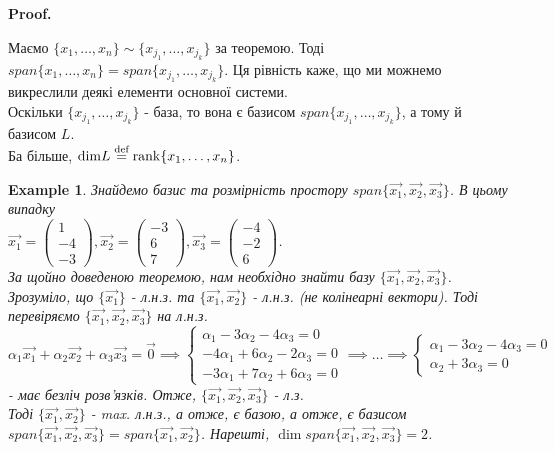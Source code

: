 \documentclass[a4paper, 10pt]{article}
\makeatletter
\def\qed{$\blacksquare$}
\theoremstyle{theoremdd}
\theoremstyle{theoremdd}
\theoremstyle{theoremdd}
\theoremstyle{theoremdd}
\newtheorem{example}[theorem]{Example}
\theoremstyle{theoremdd}
\theoremstyle{theoremdd}
\theoremstyle{theoremdd}
\theoremstyle{theoremdd}
\renewenvironment{proof}[1][Proof.\\]{\par
\pushQED{\hfill \qed}%
\normalfont \topsep6\p@\@plus6\p@\relax
\trivlist
\item\relax
{\bfseries
#1\@addpunct{.}}\hspace\labelsep\ignorespaces
}{%
\popQED\endtrivlist\@endpefalse
}
\makeatother
\begin{document}
	\begin{proof}
	Маємо $\{x_1,\dots,x_n\} \sim \{x_{j_1},\dots,x_{j_k}\}$ за теоремою. Тоді $span \{x_1,\dots,x_n\} = span \{ x_{j_1},\dots,x_{j_k} \}$. Ця рівність каже, що ми можнемо викреслили деякі елементи основної системи.\\
	Оскільки $\{x_{j_1},\dots,x_{j_k}\}$ - база, то вона є базисом $span \{ x_{j_1},\dots,x_{j_k} \}$, а тому й базисом $L$.\\
	Ба більше, $\textrm{dim} {L} \overset{\text{def}}{=} \rank \{x_1,\dots,x_n\}$.
	\end{proof}
	
	\begin{example}
	Знайдемо базис та розмірність простору $span \{ \vec{x_1}, \vec{x_2}, \vec{x_3} \}$. В цьому випадку\\
	$\vec{x_1} = \begin{pmatrix}
	1 \\ -4 \\ -3
	\end{pmatrix}, \vec{x_2} = \begin{pmatrix}
	-3 \\ 6 \\ 7
	\end{pmatrix}, \vec{x_3} = \begin{pmatrix}
	-4 \\ -2 \\ 6
	\end{pmatrix}$.\\
	За щойно доведеною теоремою, нам необхідно знайти базу $\{\vec{x_1},\vec{x_2},\vec{x_3} \}$. Зрозуміло, що $\{\vec{x_1}\}$ - л.н.з. та $\{\vec{x_1}, \vec{x_2}\}$ - л.н.з. (не колінеарні вектори). Тоді перевіряємо $\{\vec{x_1},\vec{x_2},\vec{x_3} \}$ на л.н.з.\\
	$\alpha_1 \vec{x_1} + \alpha_2 \vec{x_2} + \alpha_3 \vec{x_3} = \vec{0} \implies 		\begin{cases}
	\alpha_1 - 3 \alpha_2 - 4 \alpha_3 = 0 \\
	-4\alpha_1 + 6 \alpha_2 - 2 \alpha_3 = 0 \\
	-3\alpha_1 + 7 \alpha_2 + 6 \alpha_3 = 0
	\end{cases} \implies \dots \implies \begin{cases} \alpha_1 - 3 \alpha_2 - 4 \alpha_3 = 0 \\ \alpha_2 + 3 \alpha_3 = 0 \end{cases}$ - має безліч розв'язків. Отже, $\{\vec{x_1},\vec{x_2},\vec{x_3}\}$ - л.з.\\
	Тоді $\{\vec{x_1},\vec{x_2}\}$ - max. л.н.з., а отже, є базою, а отже, є базисом $span \{\vec{x_1},\vec{x_2},\vec{x_3} \} = span \{\vec{x_1},\vec{x_2} \}$. Нарешті, $\dim span \{\vec{x_1},\vec{x_2},\vec{x_3}\} = 2$.
	\end{example}
	
\end{document}
